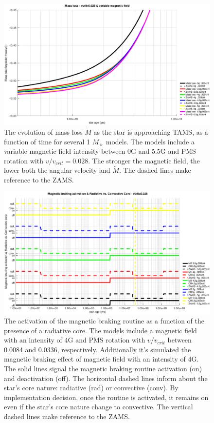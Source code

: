 \documentclass[fleqn,usenatbib]{mnras}
\begin{document}
\begin{figure}
	\includegraphics[width=\columnwidth]{figures/mdot_vc_028_var_b_z1.eps}
    \caption{The evolution of mass loss $\Dot{M}$ as the star is approaching TAMS, as a function of time for several 1 $M_{\sun}$ models. The models include a variable magnetic field intensity between 0G and 5.5G and PMS rotation with $v/v_{crit}=0.028$. The stronger the magnetic field, the lower both the angular velocity and $\Dot{M}$. The dashed lines make reference to the ZAMS.}
    \label{fig:mdot_vc_028_var_b_z1}
\end{figure}

\begin{figure}
	\includegraphics[width=\columnwidth]{figures/mb_act_var_vel_vc_028.eps}
    \caption{The activation of the magnetic braking routine as a function of the presence of a radiative core. The models include a magnetic field with an intensity of 4G and PMS rotation with $v/v_{crit}$ between 0.0084 and 0.0336, respectively. Additionally it's simulated the magnetic braking effect of magnetic field with an intensity of 4G. The solid lines signal the magnetic braking routine activation (on) and deactivation (off). The horizontal dashed lines inform about the star's core nature: radiative (rad) or convective (conv). By implementation decision, once the routine is activated, it remains on even if the star's core nature change to convective. The vertical dashed lines make reference to the ZAMS.}
    \label{fig:mb_act_var_vel_vc_028}
\end{figure}
\end{document}
